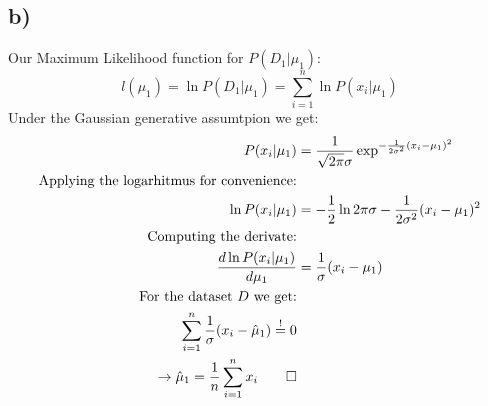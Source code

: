 \documentclass[paper=a4,fontsize=10pt,DIV11,BCOR10mm]{scrartcl}
\begin{document}
\subsection*{b)}
	Our Maximum Likelihood function for $P(D_1|\mu_1)$:
	\[
	l(\mu_1) = \ln P(D_1|\mu_1) = \sum_{i=1}^n \ln P(x_i|\mu_1)
	\]
	Under the Gaussian generative assumtpion we get:
	\begin{align*}
		P(x_i|\mu_1) &= \frac{1}{\sqrt{2\pi}\sigma}\exp^{-\frac{1}{2\sigma^2}(x_i-\mu_1)^2}\\
	\text{Applying the logarhitmus for convenience:}&\\
		\ln P(x_i|\mu_1) &=-\frac{1}{2} \ln 2\pi \sigma -\frac{1}{2\sigma^2}(x_i-\mu_1)^2\\
	\text{Computing the derivate:}&\\
		\frac{d \ln P(x_i|\mu_1)}{d \mu_1} &= \frac{1}{\sigma}(x_i- \mu_1)\\
	\text{For the dataset $D$ we get:}&\\
	\sum_{i=1}^n \frac{1}{\sigma}(x_i- \hat{\mu}_1) \stackrel{!}{=} 0\\
	\rightarrow \hat{\mu}_1=\frac{1}{n} \sum_{i=1}^n x_i \qed
	\end{align*}






\end{document}
